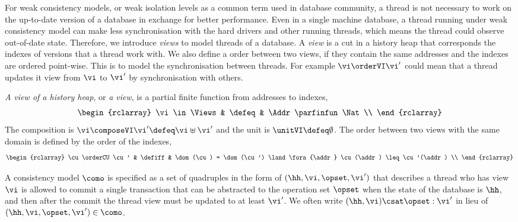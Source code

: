 For weak consistency models, or weak isolation levels as a common term used in database community, a thread is not necessary to work on the up-to-date version of a database in exchange for better performance. 
Even in a single machine database, a thread running under weak consistency model can make less synchronisation with the hard drivers and other running threads, which means the thread could observe out-of-date state.
Therefore, we introduce \emph{views} to model threads of a database.
A \emph{view} is a cut in a history heap that corresponds the indexes of versions that a thread work with.
We also define a order between two views, if they contain the same addresses and the indexes are ordered point-wise.
This is to model the synchronisation between threads.
For example \( \vi \orderVI \vi' \) could mean that a thread updates it view from \( \vi \) to \( \vi' \) by synchronisation with others.

\begin{defn}[Views]
\label{def:cuts}
\label{def:views}
\emph{A view of a history heap}, or \emph{a view}, is a partial finite function from addresses to indexes,
\[
\begin{rclarray}
    \vi \in \Views & \defeq & \Addr \parfinfun \Nat \\
\end{rclarray}
\]                                                                     
The composition is \( \vi \composeVI \vi' \defeq \vi \uplus \vi'\) and the unit is \( \unitVI \defeq \emptyset\).
The order between two views with the same domain is defined by the order of the indexes, 
\[
\begin{rclarray}
    \cu \orderCU \cu' & \defiff & \dom(\cu) = \dom(\cu') \land \fora{\addr} \cu(\addr) \leq \cu'(\addr) \\
\end{rclarray}
\]
\end{defn}

A consistency model \( \como \) is specified as a set of quadruples in the form of \( ( \hh, \vi, \opset, \vi' ) \) that describes a thread who has view \( \vi \) is allowed to commit a single transaction that can be abstracted to the operation set \( \opset \) when the state of the database is \( \hh \), and then after the commit the thread view must be updated to at least \( \vi' \).
We often write \( (\hh, \vi) \csat \opset : \vi' \) in lieu of \( (\hh, \vi, \opset, \vi') \in \como \).

